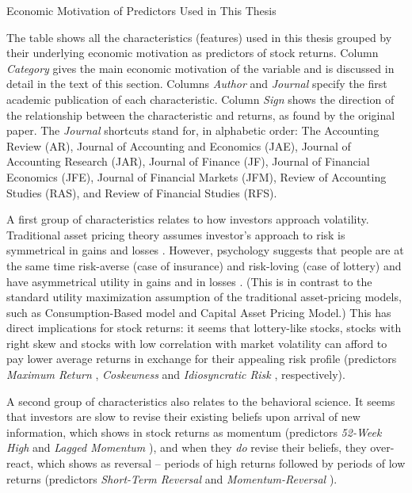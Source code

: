 			\begin{table}
				\resizebox{\textwidth}{!}{}
				\caption{Economic Motivation of Predictors Used in This Thesis}
				\label{tab:characteristics_motivation}
				\medskip
				\small 
				The table shows all the characteristics (features) used in this thesis grouped by their underlying economic motivation as predictors of stock returns. Column \textit{Category} gives the main economic motivation of the variable and is discussed in detail in the text of this section. Columns \textit{Author} and \textit{Journal} specify the first academic publication of each characteristic. Column \textit{Sign} shows the direction of the relationship between the characteristic and returns, as found by the original paper. The \textit{Journal} shortcuts stand for, in alphabetic order: The Accounting Review (AR), Journal of Accounting and Economics (JAE), Journal of Accounting Research (JAR), Journal of Finance (JF), Journal of Financial Economics (JFE), Journal of Financial Markets (JFM), Review of Accounting Studies (RAS), and Review of Financial Studies (RFS).  
			\end{table}
			
			A first group of characteristics relates to how investors approach volatility. Traditional asset pricing theory assumes investor's approach to risk is symmetrical in gains and losses \citep{cochrane2009asset}. However, psychology suggests that people are at the same time risk-averse (case of insurance) and risk-loving (case of lottery) and have asymmetrical utility in gains and in losses \citep{kahneman2013prospect}. (This is in contrast to the standard utility maximization assumption of the traditional asset-pricing models, such as Consumption-Based model and Capital Asset Pricing Model.) This has direct implications for stock returns: it seems that lottery-like stocks, stocks with right skew and stocks with low correlation with market volatility can afford to pay lower average returns in exchange for their appealing risk profile (predictors \textit{Maximum Return} \citep{bali2011maxing}, \textit{Coskewness} \citep{harvey2000conditional} and \textit{Idiosyncratic Risk} \citep{ang2006cross}, respectively).
			
			A second group of characteristics also relates to the behavioral science. It seems that investors are slow to revise their existing beliefs upon arrival of new information, which shows in stock returns as momentum (predictors \textit{52-Week High} \citep{george200452} and \textit{Lagged Momentum} \citep{novy2012momentum}), and when they \textit{do} revise their beliefs, they over-react, which shows as reversal -- periods of high returns followed by periods of low returns (predictors \textit{Short-Term Reversal} \citep{jegadeesh1990evidence} and \textit{Momentum-Reversal} \citep{jegadeesh1993returns}). 
			
